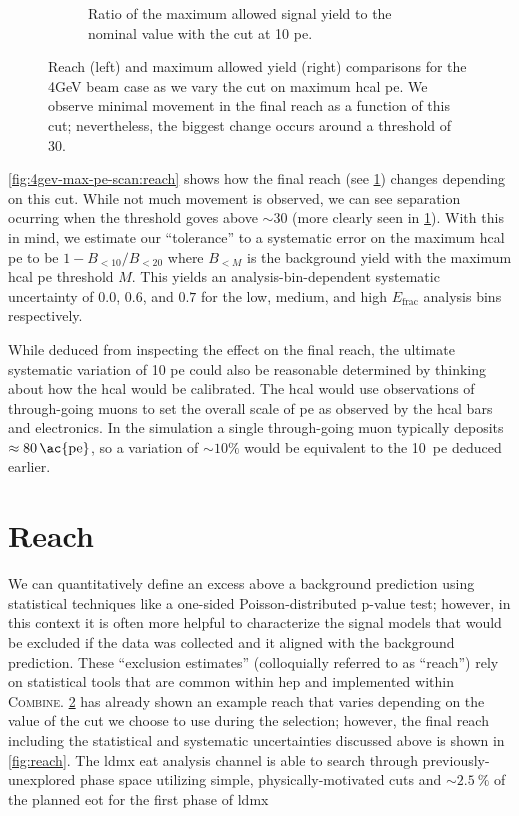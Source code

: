 \begin{figure}
\begin{subfigure}{0.48\textwidth}
    \caption{Ratio of the maximum allowed signal yield to the nominal value with the cut at 10 \ac{pe}.}
    \label{fig:4gev-max-pe-scan:ratio}
  \end{subfigure}
  \caption{Reach (left) and maximum allowed yield (right) comparisons for the 4GeV beam case
  as we vary the cut on maximum \ac{hcal} \ac{pe}.
  We observe minimal movement in the final reach as a function
  of this cut; nevertheless, the biggest change occurs around a threshold of 30.}
  \label{fig:4gev-max-pe-scan}
\end{figure}

\cref{fig:4gev-max-pe-scan:reach} shows how the final reach (see \cref{sec:ldmx:analysis:reach})
changes depending on this cut.
While not much movement is observed, we can see separation ocurring when the threshold
goves above $\sim 30$ (more clearly seen in \cref{fig:4gev-max-pe-scan:ratio}).
With this in mind, we estimate our ``tolerance'' to a systematic error on the maximum
\ac{hcal} \ac{pe} to be $1 - B_{< 10}/B_{< 20}$ where $B_{< M}$ is the background yield
with the maximum \ac{hcal} \ac{pe} threshold $M$.
This yields an analysis-bin-dependent systematic uncertainty of $0.0$, $0.6$, and $0.7$
for the low, medium, and high $E_\text{frac}$ analysis bins respectively.

While deduced from inspecting the effect on the final reach, the ultimate systematic
variation of 10 \ac{pe} could also be reasonable determined by thinking about how the \ac{hcal}
would be calibrated.
The \ac{hcal} would use observations of through-going muons to set the overall scale of \ac{pe}
as observed by the \ac{hcal} bars and electronics.
In the simulation a single through-going muon typically deposits $\approx\qty{80}{\ac{pe}}$,
so a variation of $\sim10\%$ would be equivalent to the \qty{10}{\ac{pe}} deduced earlier.

\section{Reach}
\label{sec:ldmx:analysis:reach}
We can quantitatively define an excess above a background prediction using statistical techniques
like a one-sided Poisson-distributed p-value test; however, in this context it is often more helpful
to characterize the signal models that would be excluded if the data was collected and it aligned
with the background prediction.
These ``exclusion estimates'' (colloquially referred to as ``reach'') rely on statistical tools
that are common within \ac{hep} and implemented within \textsc{Combine}\cite{cms-combine}.
\cref{fig:4gev-max-pe-scan} has already shown an example reach that varies depending on the value
of the cut we choose to use during the selection; however, the final reach including the statistical
and systematic uncertainties discussed above is shown in \cref{fig:reach}.
The \ac{ldmx} \ac{eat} analysis channel is able to search through previously-unexplored phase space
utilizing simple, physically-motivated cuts and $\sim \qty{2.5}{\percent}$ of the planned \ac{eot}
for the first phase of \ac{ldmx}

